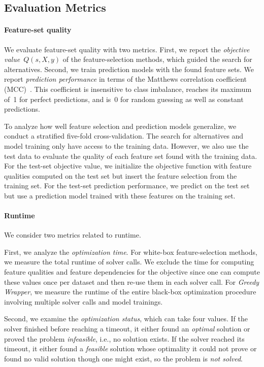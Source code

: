 \documentclass{article}
\theoremstyle{definition}
\begin{document}
\subsection{Evaluation Metrics}
\label{sec:afs:experimental-design:evaluation}

\paragraph{Feature-set quality}

We evaluate feature-set quality with two metrics.
First, we report the \emph{objective value}~$Q(s,X,y)$ of the feature-selection methods, which guided the search for alternatives.
Second, we train prediction models with the found feature sets.
We report \emph{prediction performance} in terms of the Matthews correlation coefficient (MCC)~\cite{matthews1975comparison}.
This coefficient is insensitive to class imbalance, reaches its maximum of~1 for perfect predictions, and is~0 for random guessing as well as constant predictions.

To analyze how well feature selection and prediction models generalize, we conduct a stratified five-fold cross-validation.
The search for alternatives and model training only have access to the training data.
However, we also use the test data to evaluate the quality of each feature set found with the training data.
For the test-set objective value, we initialize the objective function with feature qualities computed on the test set but insert the feature selection from the training set.
For the test-set prediction performance, we predict on the test set but use a prediction model trained with these features on the training set.

\paragraph{Runtime}

We consider two metrics related to runtime.

First, we analyze the \emph{optimization time}.
For white-box feature-selection methods, we measure the total runtime of solver calls.
We exclude the time for computing feature qualities and feature dependencies for the objective since one can compute these values once per dataset and then re-use them in each solver call.
For \emph{Greedy Wrapper}, we measure the runtime of the entire black-box optimization procedure involving multiple solver calls and model trainings.

Second, we examine the \emph{optimization status}, which can take four values.
If the solver finished before reaching a timeout, it either found an \emph{optimal} solution or proved the problem \emph{infeasible}, i.e., no solution exists.
If the solver reached its timeout, it either found a \emph{feasible} solution whose optimality it could not prove or found no valid solution though one might exist, so the problem is \emph{not solved}.
\end{document}
